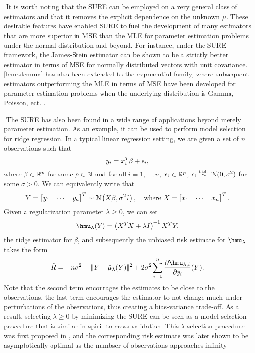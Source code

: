 $ $\newline
It is worth noting that the SURE can be employed on a very general class of estimators and that it removes the explicit dependence on the unknown $\mu$. These desirable features have enabled SURE to fuel the development of many estimators that are more superior in MSE than the MLE for parameter estimation problems under the normal distribution and beyond. For instance, under the SURE framework, the James-Stein estimator \citep{james1992estimation} can be shown to be a strictly better estimator in terms of MSE for normally distributed vectors with unit covariance. \cref{lem:slemma} has also been extended to the exponential family, where subsequent estimators outperforming the MLE in terms of MSE have been developed for parameter estimation problems when the underlying distribution is Gamma, Poisson, ect. \citep{hudson1978natural,peng1975simultaneous,tsui1978simultaneous}.

$ $\newline
The SURE has also been found in a wide range of applications beyond merely parameter estimation. As an example, it can be used to perform model selection for ridge regression. In a typical linear regression setting, we are given a set of $n$ observations such that
\[
y_i = x_i^T\beta + \epsilon_i,
\]
where $\beta\in\mathbb{R}^p$ for some $p\in\mathbb{N}$ and for all $i=1,\dots,n$, $x_i\in\mathbb{R}^p$, $\epsilon_i\overset{\textrm{\tiny i.i.d.\ }}{\sim} \mathcal{N}(0,\sigma^2)$ for some $\sigma>0$. We can equivalently write that
\[
Y = \begin{bmatrix} y_1 & \cdots & y_n \end{bmatrix}^T \sim \mathcal{N}\left(X\beta, \sigma^2I \right), \quad \text{where } X = \begin{bmatrix} x_1 & \cdots & x_n \end{bmatrix}^T.
\]
Given a regularization parameter $\lambda\geq0$, we can set
\[
\hmu_\lambda(Y) = \left( X^TX + \lambda I \right)^{-1}X^TY,
\]
the ridge estimator for $\beta$, and subsequently the unbiased risk estimate for $\hmu_\lambda$ takes the form
\[
\hat{R} = -n\sigma^2 + \| Y - \hat{\mu}_\lambda(Y) \|^2 + 2\sigma^2\sum_{i=1}^n \frac{\partial \hmu_{\lambda,i}}{\partial y_i}(Y).
\]
Note that the second term encourages the estimates to be close to the observations, the last term encourages the estimator to not change much under perturbations of the observations, thus creating a bias-variance trade-off. As a result, selecting $\lambda\geq0$ by minimizing the SURE can be seen as a model selection procedure that is similar in spirit to cross-validation. This $\lambda$ selection procedure was first proposed in \citet{10.2307/1267380}, and the corresponding risk estimate was later shown to be asymptotically optimal as the numbser of observations approaches infinity \citep{li1986asymptotic}.

$ $\newline


